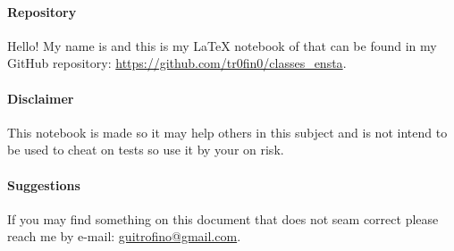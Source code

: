 \documentclass[class=article, crop=false]{standalone}
\begin{document}
\paragraph{Repository}Hello! My name is \@author\space and this is my LaTeX notebook of \@title\space that can be found in my GitHub repository: \url{https://github.com/tr0fin0/classes_ensta}.

\paragraph{Disclaimer}This notebook is made so it may help others in this subject and is not intend to be used to cheat on tests so use it by your on risk.

\paragraph{Suggestions}If you may find something on this document that does not seam correct please reach me by e-mail: \url{guitrofino@gmail.com}.
\vspace{20mm}
\end{document}
